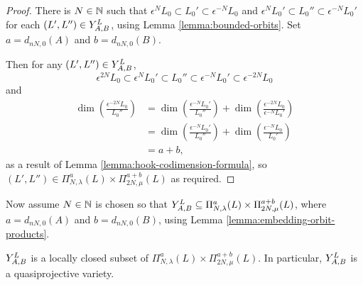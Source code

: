 \documentclass[a4paper, 11pt, twoside]{report}
\begin{document}
\begin{proof}
There is $N\in\naturals$ such that $\epsilon^N{L_0}\subset L_0'\subset\epsilon^{-N}L_0$ and $\epsilon^NL_0'\subset L_0''\subset\epsilon^{-N}L_0'$ for each $(L',L'')\in\yprod[L]{A,B}$, using Lemma \ref{lemma:bounded-orbits}. Set $a=d_{nN,0}{(A)}$ and $b=d_{nN,0}{(B)}$.

Then for any $(L',L'')\in\yprod[L]{A,B}$,
\begin{equation*}
\epsilon^{2N}L_0\subset\epsilon^NL_0'\subset L_0''\subset\epsilon^{-N}L_0'\subset\epsilon^{-2N}L_0
\end{equation*}
and
\begin{align*}
\dim\left(\frac{\epsilon^{-2N}L_0}{L_0''}\right)
&=\dim\left(\frac{\epsilon^{-N}L_0'}{L_0''}\right) + \dim\left(\frac{\epsilon^{-2N}L_0}{\epsilon^{-N}L_0'}\right)\\
&=\dim\left(\frac{\epsilon^{-N}L_0'}{L_0''}\right) + \dim\left(\frac{\epsilon^{-N}L_0}{L_0'}\right)\\
&= a+b,
\end{align*}
as a result of Lemma \ref{lemma:hook-codimension-formula}, so $(L',L'')\in\Pi_{N,\lambda}^a(L)\times\Pi_{2N,\mu}^{a+b}(L)$ as required.
\end{proof}

Now assume $N\in\naturals$ is chosen so that $\yprod[L]{A,B}\subset\Pi_{N,\lambda}^a(L)\times\Pi_{2N,\mu}^{a+b}(L)$, where $a=d_{nN,0}{(A)}$ and $b=d_{nN,0}{(B)}$, using Lemma \ref{lemma:embedding-orbit-products}.

\begin{lemma}\label{lemma:y-prod-is-quasiprojective}
$\yprod[L]{A,B}$ is a locally closed subset of $\Pi_{N,\lambda}^a(L)\times\Pi_{2N,\mu}^{a+b}(L)$. In particular, $\yprod[L]{A,B}$ is a quasiprojective variety.
\end{lemma}
\end{document}
